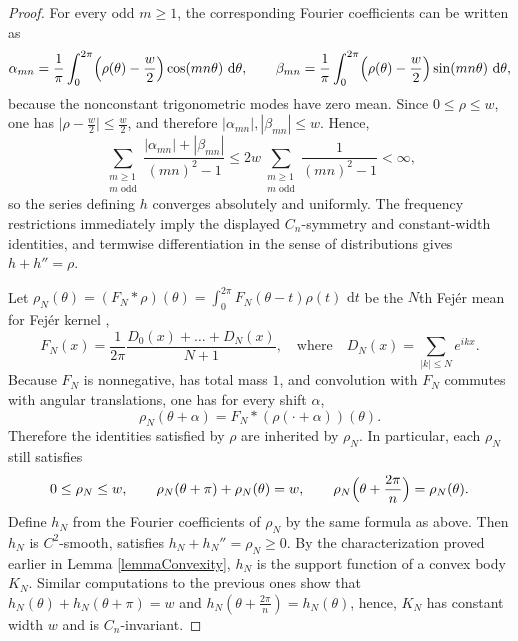 \documentclass[11pt,letterpaper,reqno]{amsart}
\newcommand{\dd}{\,\mathrm{d}}
\begin{document}
\begin{proof}
For every odd $m\ge1$, the corresponding Fourier coefficients can be written as
\[
\alpha_{mn}=\frac{1}{\pi}\int_0^{2\pi}\Bigl(\rho(\theta)-\frac w2\Bigr)\cos(mn\theta)\,\dd\theta,
\qquad
\beta_{mn}=\frac{1}{\pi}\int_0^{2\pi}\Bigl(\rho(\theta)-\frac w2\Bigr)\sin(mn\theta)\,\dd\theta,
\]
because the nonconstant trigonometric modes have zero mean. Since $0\le \rho\le w$, one has $\bigl|\rho-\frac w2\bigr|\le \frac w2$, and therefore
$
|\alpha_{mn}|,|\beta_{mn}|\le w.
$
Hence,
\[
\sum_{\substack{m\ge1\\m\text{ odd}}}
\frac{|\alpha_{mn}|+|\beta_{mn}|}{(mn)^2-1}
\le
2w\sum_{\substack{m\ge1\\m\text{ odd}}}
\frac{1}{(mn)^2-1}
<\infty,
\]
so the series defining $h$ converges absolutely and uniformly. The frequency restrictions immediately imply the displayed $C_n$-symmetry and constant-width identities, and termwise differentiation in the sense of distributions gives $h+h''=\rho$.

Let $\rho_N(\theta) = (F_N*\rho)(\theta) = \int_0^{2\pi}F_N(\theta-t)\rho(t)\,\dd t$ be the $N$th Fej\'er mean for Fej\'er kernel \cite[Section 5.1]{Edwards1},
$$
F_N(x) = \frac{1}{2 \pi} \frac{D_0(x)+\ldots+D_N(x)}{N+1}, \quad \text{where} \quad D_N(x) = \sum_{|k| \leq N} e^{ikx}.
$$
Because $F_N$ is nonnegative, has total mass $1$, and convolution with $F_N$ commutes with angular translations, one has for every shift $\alpha$,
\[
\rho_N(\theta+\alpha)=F_N*(\rho(\cdot+\alpha))(\theta).
\]
Therefore the identities satisfied by $\rho$ are inherited by $\rho_N$. In particular, each $\rho_N$ still satisfies
\[
0\le \rho_N\le w,
\qquad
\rho_N(\theta+\pi)+\rho_N(\theta)=w,
\qquad
\rho_N\Bigl(\theta+\frac{2\pi}{n}\Bigr)=\rho_N(\theta).
\]
Define $h_N$ from the Fourier coefficients of $\rho_N$ by the same formula as above. Then $h_N$ is $C^2$-smooth, satisfies $h_N+h_N''=\rho_N\ge0$. By the characterization proved earlier in Lemma \ref{lemmaConvexity}, $h_N$ is the support function of a convex body $K_N$. Similar computations to the previous ones show that $h_N(\theta)+h_N(\theta + \pi)=w$ and $h_N(\theta + \frac{2\pi}{n})=h_N(\theta)$, hence, $K_N$ has constant width $w$ and is $C_n$-invariant.


\end{proof}
\end{document}

